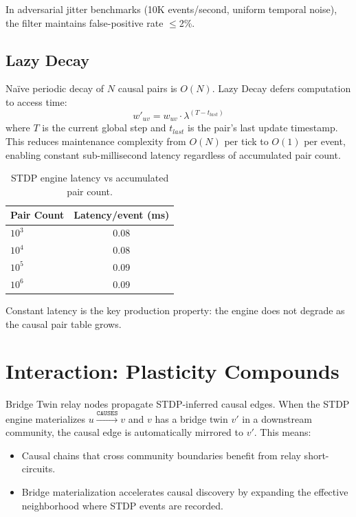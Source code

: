 \documentclass[10pt,twocolumn]{article}
\begin{document}
In adversarial jitter benchmarks (10K events/second, uniform temporal noise), the filter
maintains false-positive rate $\leq$2\%.

\subsection{Lazy Decay}

Na\"{i}ve periodic decay of $N$ causal pairs is $O(N)$. Lazy Decay defers computation
to access time:
\begin{equation}
w'_{uv} = w_{uv} \cdot \lambda^{(T - t_{last})}
\label{eq:lazy}
\end{equation}
where $T$ is the current global step and $t_{last}$ is the pair's last update timestamp.
This reduces maintenance complexity from $O(N)$ per tick to $O(1)$ per event,
enabling constant sub-millisecond latency regardless of accumulated pair count.

\begin{table}[h]
\small\centering
\caption{STDP engine latency vs accumulated pair count.}
\label{tab:stdp_latency}
\begin{tabular}{lc}
\toprule
\textbf{Pair Count} & \textbf{Latency/event (ms)} \\
\midrule
$10^3$   & 0.08 \\
$10^4$   & 0.08 \\
$10^5$   & 0.09 \\
$10^6$   & 0.09 \\
\bottomrule
\end{tabular}
\end{table}

\noindent Constant latency is the key production property: the engine does not degrade
as the causal pair table grows.

\section{Interaction: Plasticity Compounds}
\label{sec:interaction}

Bridge Twin relay nodes propagate STDP-inferred causal edges. When the STDP engine
materializes $u \xrightarrow{\texttt{CAUSES}} v$ and $v$ has a bridge twin $v'$ in a
downstream community, the causal edge is automatically mirrored to $v'$. This means:
\begin{itemize}
  \item Causal chains that cross community boundaries benefit from relay short-circuits.
  \item Bridge materialization accelerates causal discovery by expanding the effective
        neighborhood where STDP events are recorded.
\end{itemize}
\end{document}
